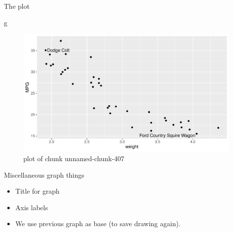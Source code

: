 \documentclass[ignorenonframetext,]{beamer}
\newenvironment{Shaded}{\begin{snugshade}}{\end{snugshade}}
\newcommand{\NormalTok}[1]{#1}
\providecommand{\tightlist}{%
  \setlength{\itemsep}{0pt}\setlength{\parskip}{0pt}}
\begin{document}
\begin{frame}[fragile]{The plot}
\protect\hypertarget{the-plot-7}{}

\begin{Shaded}
\begin{Highlighting}[]
\NormalTok{g}
\end{Highlighting}
\end{Shaded}

\begin{figure}
\centering
\includegraphics{figure/unnamed-chunk-407-1.pdf}
\caption{plot of chunk unnamed-chunk-407}
\end{figure}

\end{frame}

\begin{frame}{Miscellaneous graph things}
\protect\hypertarget{miscellaneous-graph-things}{}

\begin{itemize}
\tightlist
\item
  Title for graph
\item
  Axis labels
\item
  We use previous graph as base (to save drawing again).
\end{itemize}

\end{frame}
\end{document}
